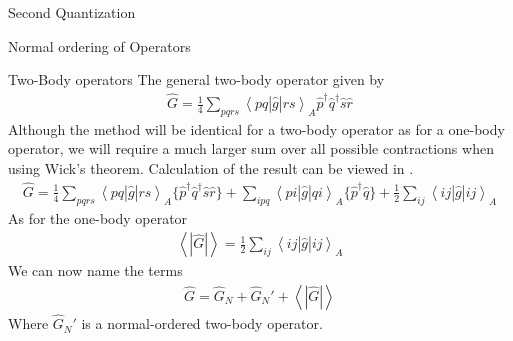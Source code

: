 \documentclass[twoside,english]{uiofysmaster}
\begin{document}
\begin{chapter}{Second Quantization}
\begin{section}{Normal ordering of Operators}
		\begin{subsection}{Two-Body operators}
			The general two-body operator given by
			\begin{align}
				\hat G = \frac{1}{4} \sum_{pqrs} \left< pq | \hat g | rs \right>_A \hat p^\dagger \hat q^\dagger \hat s \hat r
			\end{align}
			Although the method will be identical for a two-body operator as for a one-body operator, we will require a much larger sum over all possible contractions when using Wick's theorem. Calculation of the result can be viewed in \cite{ShavittAndBartlett}. 
			\begin{align}
				\hat G = \frac{1}{4} \sum_{pqrs} \left<pq | \hat g | rs\right>_A \{ \hat p^\dagger \hat q^\dagger \hat s \hat r \}+ \sum_{ipq} \left<pi |\hat g | qi\right>_A \{ \hat p^\dagger \hat q\} + \frac{1}{2} \sum_{ij} \left< ij | \hat g | ij \right>_A 
				\label{Two-Body Normal Ordering}
			\end{align}
			As for the one-body operator
			\begin{align}
				\left< \right. | \hat G | \left.  \right> = \frac{1}{2} \sum_{ij} \left< ij | \hat g | ij \right>_A 
			\end{align}
			We can now name the terms 
			\begin{align}
				\hat G = \hat G_N + \hat G_N' + \left< \right. | \hat G | \left.  \right>
			\end{align}
			Where $\hat G_N'$ is a normal-ordered two-body operator. 

		\end{subsection}
	\end{section}


\end{chapter}
\end{document}
